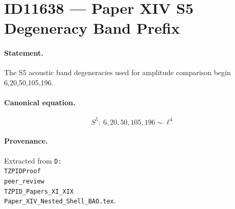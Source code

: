 \section*{ID11638 --- Paper XIV S5 Degeneracy Band Prefix}

\paragraph{Statement.}
The S5 acoustic band degeneracies used for amplitude comparison begin 6,20,50,105,196.

\paragraph{Canonical equation.}
\[
S^5:\ 6,20,50,105,196\sim\ell^4
\]

\paragraph{Provenance.}
Extracted from \texttt{D:\\TZPIDProof\\peer\_review\\TZPID\_Papers\_XI\_XIX\\Paper\_XIV\_Nested\_Shell\_BAO.tex}.
